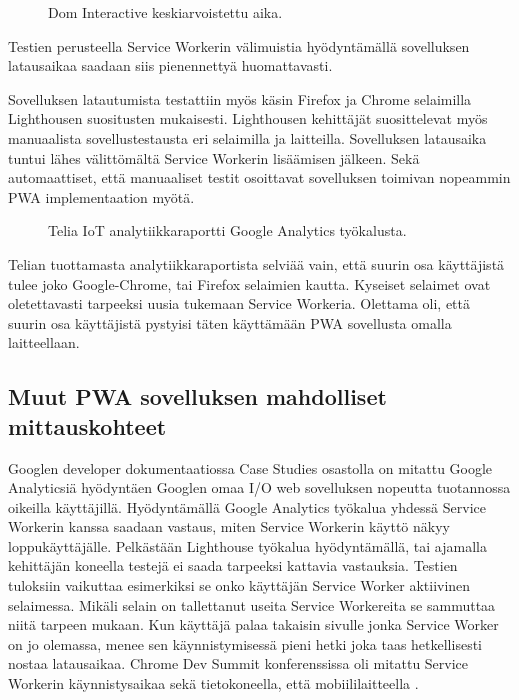 \documentclass{tktltiki}
\begin{document}
\begin{figure}[!h]
\begin{center}
\caption{Dom Interactive keskiarvoistettu aika.}
\label{Dom Interactive keskiarvoistettu aika}
\end{center}
\end{figure}

Testien perusteella Service Workerin välimuistia hyödyntämällä sovelluksen latausaikaa saadaan siis pienennettyä huomattavasti. 

Sovelluksen latautumista testattiin myös käsin Firefox ja Chrome selaimilla Lighthousen suositusten mukaisesti. Lighthousen kehittäjät suosittelevat myös manuaalista sovellustestausta eri selaimilla ja laitteilla. Sovelluksen latausaika tuntui lähes välittömältä Service Workerin lisäämisen jälkeen. Sekä automaattiset, että manuaaliset testit osoittavat sovelluksen toimivan nopeammin PWA implementaation myötä. 

\begin{figure}[!h]
\begin{center}
\caption{Telia IoT analytiikkaraportti Google Analytics työkalusta.}
\label{Google Analytics raportti Telia IoT}
\end{center}
\end{figure}

Telian tuottamasta analytiikkaraportista selviää vain, että suurin osa käyttäjistä tulee joko Google-Chrome, tai Firefox selaimien kautta. Kyseiset selaimet ovat oletettavasti tarpeeksi uusia tukemaan Service Workeria. Olettama oli, että suurin osa käyttäjistä pystyisi täten käyttämään PWA sovellusta omalla laitteellaan. 

\clearpage

\subsection{Muut PWA sovelluksen mahdolliset mittauskohteet}

Googlen developer dokumentaatiossa Case Studies osastolla on mitattu Google Analyticsiä hyödyntäen Googlen omaa I/O web sovelluksen nopeutta tuotannossa oikeilla käyttäjillä. Hyödyntämällä Google Analytics työkalua yhdessä Service Workerin kanssa saadaan vastaus, miten Service Workerin käyttö näkyy loppukäyttäjälle. Pelkästään Lighthouse työkalua hyödyntämällä, tai ajamalla kehittäjän koneella testejä ei saada tarpeeksi kattavia vastauksia. Testien tuloksiin vaikuttaa esimerkiksi se onko käyttäjän Service Worker aktiivinen selaimessa. Mikäli selain on tallettanut useita Service Workereita se sammuttaa niitä tarpeen mukaan. Kun käyttäjä palaa takaisin sivulle jonka Service Worker on jo olemassa, menee sen käynnistymisessä pieni hetki joka taas hetkellisesti nostaa latausaikaa. Chrome Dev Summit konferenssissa oli mitattu Service Workerin käynnistysaikaa sekä tietokoneella, että mobiililaitteella \cite{GoogleDevSummit}. 
\end{document}
